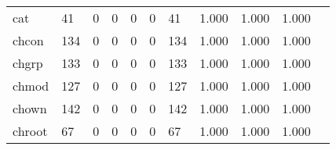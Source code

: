 \begin{longtable}{lp{1.2cm}p{1.2cm}p{1.2cm}p{1.2cm}p{1.2cm}p{1.2cm}p{1.2cm}p{1.2cm}p{1.2cm}p{1.2cm}}
cat       &                                    41 &                                                  0 &                                                  0 &                                                  0 &                                                  0 &                                                 41 &                                         1.000 &                                              1.000 &                                              1.000 \\
chcon     &                                   134 &                                                  0 &                                                  0 &                                                  0 &                                                  0 &                                                134 &                                         1.000 &                                              1.000 &                                              1.000 \\
chgrp     &                                   133 &                                                  0 &                                                  0 &                                                  0 &                                                  0 &                                                133 &                                         1.000 &                                              1.000 &                                              1.000 \\
chmod     &                                   127 &                                                  0 &                                                  0 &                                                  0 &                                                  0 &                                                127 &                                         1.000 &                                              1.000 &                                              1.000 \\
chown     &                                   142 &                                                  0 &                                                  0 &                                                  0 &                                                  0 &                                                142 &                                         1.000 &                                              1.000 &                                              1.000 \\
chroot    &                                    67 &                                                  0 &                                                  0 &                                                  0 &                                                  0 &                                                 67 &                                         1.000 &                                              1.000 &                                              1.000 \\

\end{longtable}
